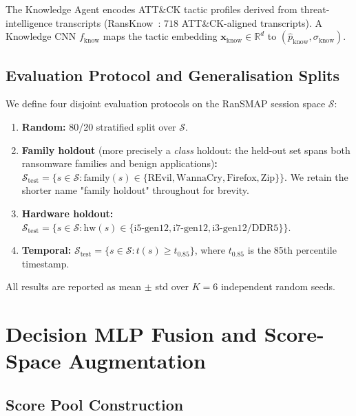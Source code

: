 \documentclass[journal]{IEEEtran}
\newcommand{\R}{\mathbb{R}}
\begin{document}
The Knowledge Agent encodes ATT\&CK tactic profiles derived from
threat-intelligence transcripts (RansKnow~\cite{ransknow_2026}: $718$
ATT\&CK-aligned transcripts). A Knowledge CNN $f_{\text{know}}$ maps the
tactic embedding $\mathbf{x}_{\text{know}} \in \R^{d}$ to
$(\hat{p}_{\text{know}}, \sigma_{\text{know}})$.

\subsection{Evaluation Protocol and Generalisation Splits}

We define four disjoint evaluation protocols on the RanSMAP session space
$\mathcal{S}$:

\begin{enumerate}
  \item \textbf{Random:} 80/20 stratified split over $\mathcal{S}$.
  \item \textbf{Family holdout} (more precisely a \emph{class} holdout: the
        held-out set spans both ransomware families and benign
        applications)\textbf{:} $\mathcal{S}_{\text{test}} =
        \{s \in \mathcal{S} : \text{family}(s) \in
        \{\text{REvil},\text{WannaCry},\text{Firefox},\text{Zip}\}\}$. We
        retain the shorter name "family holdout" throughout for brevity.
  \item \textbf{Hardware holdout:} $\mathcal{S}_{\text{test}} =
        \{s \in \mathcal{S} : \text{hw}(s) \in
        \{\text{i5-gen12},\text{i7-gen12},\text{i3-gen12/DDR5}\}\}$.
  \item \textbf{Temporal:} $\mathcal{S}_{\text{test}} =
        \{s \in \mathcal{S} : t(s) \geq t_{0.85}\}$,
        where $t_{0.85}$ is the 85th percentile timestamp.
\end{enumerate}

All results are reported as mean $\pm$ std over $K=6$ independent random
seeds.

\section{Decision MLP Fusion and Score-Space Augmentation}\label{sec:fusion}

\subsection{Score Pool Construction}
\end{document}
